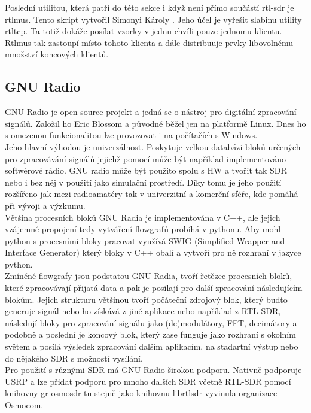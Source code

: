 \documentclass{ctuthesis}
\begin{document}
Poslední utilitou, která patří do této sekce i když není přímo součástí rtl-sdr je rtl\textunderscore mus. Tento skript vytvořil Simonyi Károly \cite{rtlmus}. Jeho účel je vyřešit slabinu utility rtl\textunderscore tcp. Ta totiž dokáže posílat vzorky v jednu chvíli pouze jednomu klientu. Rtl\textunderscore mus tak zastoupí místo tohoto klienta a dále distribuuje prvky libovolnému množství koncových klientů.

\subsection{GNU Radio} \label{gnuradiosekce}
GNU Radio je open source projekt a jedná se o nástroj pro digitální zpracování signálů. Založil ho Eric Blossom a původně běžel jen na platformě Linux. Dnes ho s omezenou funkcionalitou lze provozovat i na počítačích s Windows.\\
Jeho hlavní výhodou je univerzálnost. Poskytuje velkou databázi bloků určených pro zpracovávání signálů jejichž pomocí může být například implementováno softwérové rádio. GNU radio může být použito spolu s HW a tvořit tak SDR nebo i bez něj v použití jako simulační prostředí. Díky tomu je jeho použití rozšířeno jak mezi radioamatéry tak v univerzitní a komerční sféře, kde pomáhá při vývoji a výzkumu.\\
Většina procesních bloků GNU Radia je implementována v C++, ale jejich vzájemné propojení  tedy vytváření flowgrafů probíhá v pythonu. Aby mohl python s procesními bloky pracovat využívá SWIG (Simplified Wrapper and Interface Generator) který bloky v C++ obalí a vytvoří pro ně rozhraní v jazyce python. \cite{gnuradio}\\
Zmíněné flowgrafy jsou podstatou GNU Radia, tvoří řetězec procesních bloků, které zpracovávají přijatá data a pak je posílají pro další zpracování následujícím blokům. Jejich strukturu většinou tvoří počáteční zdrojový blok, který buďto generuje signál nebo ho získává z jiné aplikace nebo například z RTL-SDR, následují bloky pro zpracování signálu jako (de)modulátory, FFT, decimátory a podobně a poslední je koncový blok, který zase funguje jako rozhraní s okolním světem a posílá výsledek zpracování dalším aplikacím, na stadartní výstup nebo do nějakého SDR s možností vysílání.\\
Pro použití s různými SDR má GNU Radio širokou podporu. Nativně podporuje USRP a lze přidat podporu pro mnoho dalších SDR včetně RTL-SDR pomocí knihovny gr-osmosdr  tu stejně jako knihovnu librtlsdr vyvinula organizace Osmocom.
\end{document}
